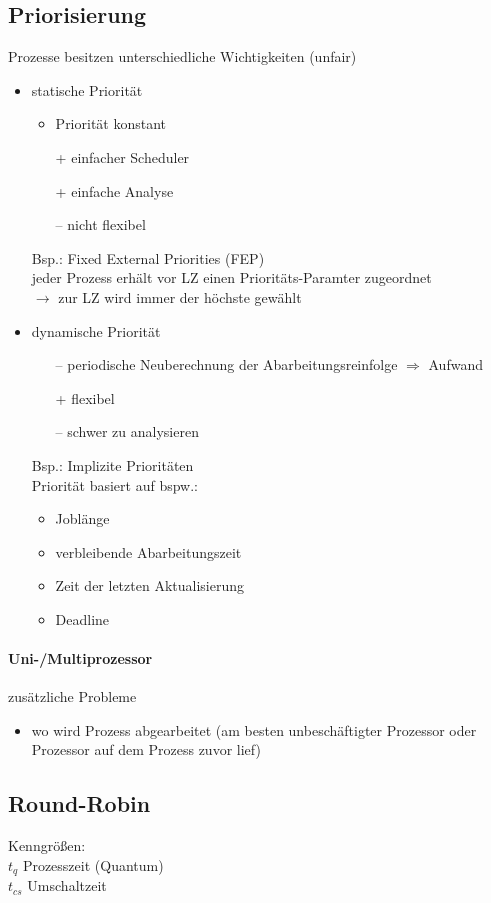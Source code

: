 \documentclass{scrreprt}
\renewcommand{\imptnt}[1]{#1}
\begin{document}
\subsection{Priorisierung}
Prozesse besitzen unterschiedliche Wichtigkeiten (unfair)
\begin{itemize}
\item \imptnt{statische Priorität}
\begin{itemize}
\item Priorität konstant
\item[+] einfacher Scheduler
\item[+] einfache Analyse
\item[--] nicht flexibel
\end{itemize}
Bsp.: \imptnt{Fixed External Priorities (FEP)}\\
jeder Prozess erhält vor LZ einen Prioritäts-Paramter zugeordnet\\
$\to$ zur LZ wird immer der höchste gewählt
\item \imptnt{dynamische Priorität}
\begin{itemize}
\item[--] periodische Neuberechnung der Abarbeitungsreinfolge $\Rightarrow$ Aufwand
\item[+] flexibel
\item[--] schwer zu analysieren
\end{itemize}
Bsp.: \imptnt{Implizite Prioritäten}\\
Priorität basiert auf bspw.:
\begin{itemize}
\item Joblänge
\item verbleibende Abarbeitungszeit
\item Zeit der letzten Aktualisierung
\item Deadline
\end{itemize}
\end{itemize}

\paragraph{Uni-/Multiprozessor} zusätzliche Probleme
\begin{itemize}
\item wo wird Prozess abgearbeitet (am besten unbeschäftigter Prozessor oder Prozessor auf dem Prozess zuvor lief)
\end{itemize}

\subsection{Round-Robin}
Kenngrößen:\\
\imptnt{$t_q$} \quad Prozesszeit (Quantum)\\
\imptnt{$t_{cs}$} \quad Umschaltzeit
\end{document}
